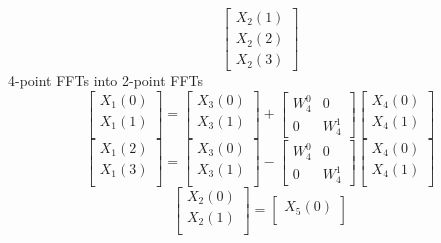 \documentclass[journal,12pt,twocolumn]{IEEEtran}
\renewcommand\thesection{\arabic{section}}
\begin{document}
\begin{enumerate}[label=\arabic*.,ref=\thesection.\theenumi]
\begin{equation}
\begin{bmatrix}
			X_{2}(1) \\ 
			X_{2}(2) \\
			X_{2}(3)
		\end{bmatrix}
	\end{equation}
	4-point FFTs into 2-point FFTs
	\begin{equation}
		\begin{bmatrix}
			X_{1}(0) \\ 
			X_{1}(1)\\ 
		\end{bmatrix}
		=
		\begin{bmatrix}
			X_{3}(0) \\ 
			X_{3}(1)\\ 
		\end{bmatrix}
		+
		\begin{bmatrix}
			W^{0}_{4} & 0\\
			0 & W^{1}_{4}
		\end{bmatrix}
		\begin{bmatrix}
			X_{4}(0) \\ 
			X_{4}(1) \\ 
		\end{bmatrix}
	\end{equation}
	\begin{equation}
		\begin{bmatrix}
			X_{1}(2) \\ 
			X_{1}(3)\\ 
		\end{bmatrix}
		=
		\begin{bmatrix}
			X_{3}(0) \\ 
			X_{3}(1)\\ 
		\end{bmatrix}
		-
		\begin{bmatrix}
			W^{0}_{4} & 0\\
			0 & W^{1}_{4}
		\end{bmatrix}
		\begin{bmatrix}
			X_{4}(0) \\ 
			X_{4}(1) \\ 
		\end{bmatrix}
	\end{equation}
	\begin{equation}
		\begin{bmatrix}
			X_{2}(0) \\ 
			X_{2}(1)\\ 
		\end{bmatrix}
		=
		\begin{bmatrix}
			X_{5}(0) \\ 

\end{bmatrix}
\end{equation}
\end{enumerate}
\end{document}
